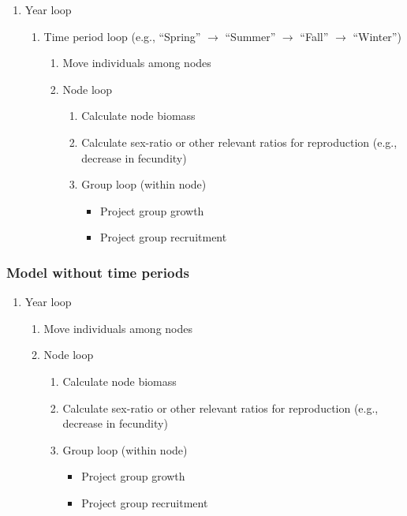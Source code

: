 \documentclass{article}[12pt]
\begin{document}
\begin{enumerate}
\item Year loop
	\begin{enumerate}
	\item Time period loop (e.g., ``Spring'' \(\rightarrow\) ``Summer'' \(\rightarrow\) ``Fall'' \(\rightarrow\) ``Winter'')
		\begin{enumerate}
		\item Move individuals among nodes 
		\item Node loop
			\begin{enumerate}
			\item Calculate node biomass
			\item Calculate sex-ratio or other relevant ratios for reproduction (e.g., decrease in fecundity)
			\item Group loop (within node)
				\begin{itemize}
				\item Project group growth
				\item Project group recruitment
				\end{itemize}
			\end{enumerate}
		\end{enumerate}
	\end{enumerate}
\end{enumerate}


\subsubsection{Model without time periods}

\begin{enumerate}
\item Year loop
	\begin{enumerate}
	\item Move individuals among nodes 
	\item Node loop
		\begin{enumerate}
		\item Calculate node biomass	
		\item Calculate sex-ratio or other relevant ratios for reproduction  (e.g., decrease in fecundity)
		\item Group loop (within node)
			\begin{itemize}
			\item Project group growth
			\item Project group recruitment
			\end{itemize}
		\end{enumerate}
	\end{enumerate}
\end{enumerate}
\end{document}

